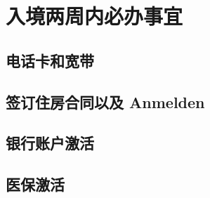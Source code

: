\chapter{入境两周内必办事宜}

\section{电话卡和宽带}

\section{签订住房合同以及 Anmelden}

\section{银行账户激活}

\section{医保激活}
